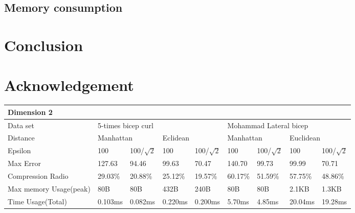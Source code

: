 \documentclass[10pt, conference, compsocconf]{IEEEtran}
\begin{document}
\subsection{Memory consumption}

\section{Conclusion}

\section*{Acknowledgement}
\begin{table}[]
    \begin{tabular}{|l|l|l|l|l|l|l|l|l|}
    \hline
    \multicolumn{9}{|l|}{Dimension 2}                                                                                                                         \\ \hline
    Data set               & \multicolumn{4}{l|}{5-times bicep curl}                        & \multicolumn{4}{l|}{Mohammad Lateral bicep}                     \\ \hline
    Distance               & \multicolumn{2}{l|}{Manhattan} & \multicolumn{2}{l|}{Eclidean} & \multicolumn{2}{l|}{Manhattan} & \multicolumn{2}{l|}{Euclidean} \\ \hline
    Epsilon                & 100          & 100/$\sqrt{2}$  & 100         & 100/$\sqrt{2}$  & 100        & 100/$\sqrt{2}$    & 100        & 100/$\sqrt{2}$    \\ \hline
    Max Error              & 127.63       & 94.46           & 99.63       & 70.47           & 140.70     & 99.73             & 99.99      & 70.71             \\ \hline
    Compression Radio      & 29.03\%      & 20.88\%         & 25.12\%     & 19.57\%         & 60.17\%    & 51.59\%           & 57.75\%    & 48.86\%           \\ \hline
    Max memory Usage(peak) & 80B          & 80B             & 432B        & 240B            & 80B        & 80B               & 2.1KB      & 1.3KB             \\ \hline
    Time Usage(Total)      & 0.103ms      & 0.082ms         & 0.220ms     & 0.200ms         & 5.70ms     & 4.85ms            & 20.04ms    & 19.28ms           \\ \hline
    \end{tabular}
\end{table}
\end{document}
